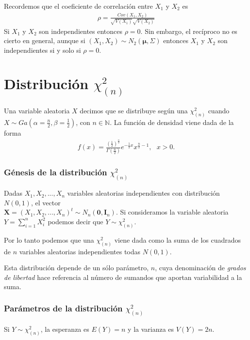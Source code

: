 \begin{obs}
    Recordemos que el coeficiente de correlación entre $X_1$ y $X_2$ es
    \begin{align*}
        \rho = \frac{Cov(X_1,X_2)}{\sqrt{V(X_1)}\sqrt{V(X_2)}}
    \end{align*}
    Si $X_1$ y $X_2$ son independientes entonces $\rho = 0$. Sin embargo, el recíproco no es cierto en general, aunque si $(X_1,X_2) \sim N_2(\boldsymbol{\mu}, \Sigma)$ entonces $X_1$ y $X_2$ son independientes si y solo si $\rho = 0$.
\end{obs}

\section{Distribución $\chi_{(n)}^2$}
\begin{defi}
    Una variable aleatoria $X$ decimos que se distribuye según una $\chi_{(n)}^2$ cuando $X \sim Ga\left(\alpha = \frac{n}{2}, \beta = \frac{1}{2}\right)$, con $n \in \mathbb{N}$. La función de densidad viene dada de la forma
    \begin{align*}
        f(x) = \frac{\left(\frac{1}{2}\right)^{\frac{n}{2}}}{\Gamma\left( \frac{n}{2}\right)}e^{-\frac{1}{2}x}x^{\frac{n}{2} -1}, \ \ \ x > 0.
    \end{align*}
\end{defi}
\subsubsection{Génesis de la distribución $\chi_{(n)}^2$}
Dadas $X_1,X_2,...,X_n$ variables aleatorias independientes con distribución $N(0,1)$, el vector \\ $\textbf{X} = (X_1,X_2,...,X_n)^t \sim N_n(\textbf{0},\textbf{I}_n)$. Si consideramos la variable aleatoria $Y = \sum_{i=1}^{n}{X_i^2}$ podemos decir que $Y \sim \chi_{(n)}^2$.

Por lo tanto podemos que una $\chi_{(n)}^2$ viene dada como la suma de los cuadrados de $n$ variables aleatorias independientes todas $N(0,1)$.

Esta distribución depende de un sólo parámetro, $n$, cuya denominación de \textit{grados de libertad} hace referencia al número de sumandos que aportan variabilidad a la suma.

\subsubsection{Parámetros de la distribución $\chi_{(n)}^2$}
Si $Y \sim \chi_{(n)}^2$, la esperanza es $E(Y) = n$ y la varianza es $V(Y) = 2n$.

